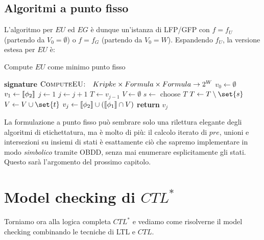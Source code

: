 \subsection{Algoritmi a punto fisso}

L'algoritmo per \(EU\) ed \(EG\) è dunque un'istanza di \textsc{LFP}/\textsc{GFP} con \(f = f_U\) (partendo da \(V_0 = \emptyset\)) o \(f = f_G\) (partendo da \(V_0 = W\)). Espandendo \(f_U\), la versione estesa per \(EU\) è:

\begin{algorithmdesc}{Compute \(EU\) come minimo punto fisso}
  \begin{algorithmic}[1]
    \Statex{} \textbf{signature} \(\textsc{ComputeEU:} \quad Kripke \times Formula \times Formula \to 2^W \)
    \State{} \(v_0 \gets \emptyset\) \Comment{\(\den{\bot}\)}
    \State{} \(v_1 \gets \den{\phi_2}\)
    \State{} \(j \gets 1\)
    \State{} \(j \gets j + 1\)
    \State{} \(T \gets v_{j-1}\)
    \State{} \(V\gets \emptyset\)
     
    \State{} \(s \gets\) choose \(T\)
    \State{} \(T \gets T\setminus\set{s}\)
    \State{} \(V \gets V\cup\set{t}\)
    \EndFor{}
    \EndWhile{}
    \State{} \(v_{j} \gets \den{\phi_2} \cup \left(\den{\phi_1} \cap V\right)\)
    \EndWhile{}
    \State{} \textbf{return} \(v_j\)
    \EndFunction{}
  \end{algorithmic}
\end{algorithmdesc}

\begin{note}{}
  La formulazione a punto fisso può sembrare solo una rilettura elegante degli algoritmi di etichettatura, ma è molto di più: il calcolo iterato di \(pre\), unioni e intersezioni su insiemi di stati è esattamente ciò che sapremo implementare in modo \emph{simbolico} tramite OBDD, senza mai enumerare esplicitamente gli stati. Questo sarà l'argomento del prossimo capitolo.
\end{note}

\section{Model checking di \texorpdfstring{\(CTL^*\)}{CTL*}}

Torniamo ora alla logica completa \(CTL^*\) e vediamo come risolverne il model checking combinando le tecniche di LTL e \(CTL\)\@.

